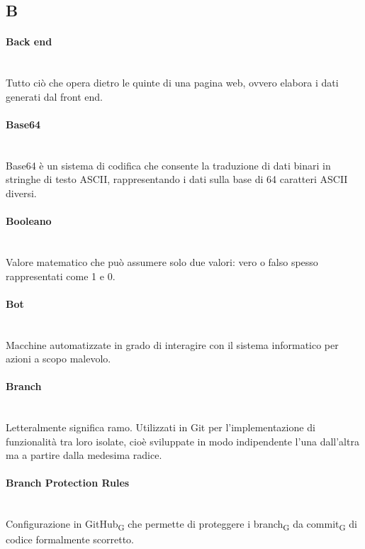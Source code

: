 \subsection*{B}

\paragraph{Back end}~\smallskip \\
Tutto ciò che opera dietro le quinte di una pagina web, ovvero elabora i dati generati dal front end.

\paragraph{Base64}~\smallskip \\
Base64 è un sistema di codifica che consente la traduzione di dati binari in stringhe di testo ASCII, rappresentando i dati sulla base di 64 caratteri ASCII diversi.

\paragraph{Booleano}~\smallskip \\
Valore matematico che può assumere solo due valori: vero o falso spesso rappresentati come 1 e 0.

\paragraph{Bot}~\smallskip \\
Macchine automatizzate in grado di interagire con il sistema informatico per azioni a scopo malevolo.

\paragraph{Branch}~\smallskip \\
Letteralmente significa ramo. Utilizzati in Git per l'implementazione di funzionalità tra loro isolate, cioè sviluppate in modo indipendente l'una dall'altra ma a partire dalla medesima radice.

\paragraph{Branch Protection Rules}~\smallskip \\
Configurazione in GitHub\textsubscript{G} che permette di proteggere i branch\textsubscript{G} da commit\textsubscript{G} di codice formalmente scorretto.

